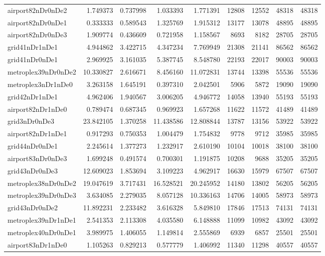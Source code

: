 \begin{longtable}{|l|r|r|r|r|r|r|r|r|}
airport82nDr0nDe2 & 1.749373 & 0.737998 & 1.033393 & 1.771391 & 12808 & 12552 & 48318 & 48318 \\
airport82nDr0nDe1 & 0.333333 & 0.589543 & 1.325769 & 1.915312 & 13177 & 13078 & 48895 & 48895 \\
airport82nDr0nDe3 & 1.909774 & 0.436609 & 0.721958 & 1.158567 & 8693 & 8182 & 28705 & 28705 \\
grid41nDr1nDe1 & 4.944862 & 3.422715 & 4.347234 & 7.769949 & 21308 & 21141 & 86562 & 86562 \\
grid41nDr0nDe1 & 2.969925 & 3.161035 & 5.387745 & 8.548780 & 22193 & 22017 & 90003 & 90003 \\
metroplex39nDr0nDe2 & 10.330827 & 2.616671 & 8.456160 & 11.072831 & 13744 & 13398 & 55536 & 55536 \\
metroplex3nDr1nDe0 & 3.263158 & 1.645191 & 0.397310 & 2.042501 & 5906 & 5872 & 19090 & 19090 \\
grid42nDr1nDe1 & 4.962406 & 1.940567 & 3.006205 & 4.946772 & 14058 & 13940 & 55193 & 55193 \\
airport82nDr1nDe0 & 0.789474 & 0.687345 & 0.969923 & 1.657268 & 11622 & 11572 & 41489 & 41489 \\
grid3nDr0nDe3 & 23.842105 & 1.370258 & 11.438586 & 12.808844 & 13787 & 13156 & 53922 & 53922 \\
airport82nDr1nDe1 & 0.917293 & 0.750353 & 1.004479 & 1.754832 & 9778 & 9712 & 35985 & 35985 \\
grid44nDr0nDe1 & 2.245614 & 1.377273 & 1.232917 & 2.610190 & 10104 & 10018 & 38100 & 38100 \\
airport83nDr0nDe3 & 1.699248 & 0.491574 & 0.700301 & 1.191875 & 10208 & 9688 & 35205 & 35205 \\
grid43nDr0nDe3 & 12.609023 & 1.853694 & 3.109223 & 4.962917 & 16630 & 15979 & 67507 & 67507 \\
metroplex38nDr0nDe2 & 19.047619 & 3.717431 & 16.528521 & 20.245952 & 14180 & 13802 & 56205 & 56205 \\
metroplex39nDr0nDe3 & 3.634085 & 2.279035 & 8.057128 & 10.336163 & 14706 & 14005 & 58973 & 58973 \\
grid43nDr0nDe2 & 11.892231 & 2.233482 & 3.616328 & 5.849810 & 17846 & 17513 & 74131 & 74131 \\
metroplex39nDr1nDe1 & 2.541353 & 2.113308 & 4.035580 & 6.148888 & 11099 & 10982 & 43092 & 43092 \\
metroplex40nDr0nDe1 & 3.989975 & 1.406055 & 1.149814 & 2.555869 & 6939 & 6857 & 25501 & 25501 \\
airport83nDr1nDe0 & 1.105263 & 0.829213 & 0.577779 & 1.406992 & 11340 & 11298 & 40557 & 40557 \\

\end{longtable}
